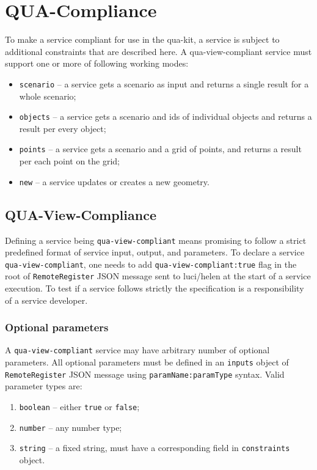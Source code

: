 \section{QUA-Compliance}
\label{ch:quacompliance}

To make a service compliant for use in the qua-kit, a service is subject to additional constraints that are described here.
A qua-view-compliant service must support one or more of following working modes:
\begin{itemize}
\item
    \texttt{scenario} -- a service gets a scenario as input and returns a single result for a whole scenario;
\item
    \texttt{objects} -- a service gets a scenario and ids of individual objects and returns a result per every object;
\item
    \texttt{points} -- a service gets a scenario and a grid of points, and returns a result per each point on the grid;
\item
    \texttt{new} -- a service updates or creates a new geometry.
\end{itemize}

\subsection{QUA-View-Compliance}

Defining a service being
\texttt{qua-view-compliant} means promising to follow a strict predefined format of service input, output, and parameters.
To declare a service \texttt{qua-view-compliant}, one needs to add \texttt{qua-view-compliant:true} flag in the root
of \texttt{RemoteRegister} JSON message sent to luci/helen at the start of a service execution.
To test if a service follows strictly the specification is a responsibility of a service developer.

\subsubsection{Optional parameters}

A \texttt{qua-view-compliant} service may have arbitrary number of optional parameters.
All optional parameters must be defined in an \texttt{inputs} object of \texttt{RemoteRegister} JSON message
using \texttt{paramName:paramType} syntax.
Valid parameter types are:
\begin{enumerate}
\item \texttt{boolean} -- either \texttt{true} or \texttt{false};
\item \texttt{number} -- any number type;
\item \texttt{string} -- a fixed string, must have a corresponding field in \texttt{constraints} object.
\end{enumerate}


